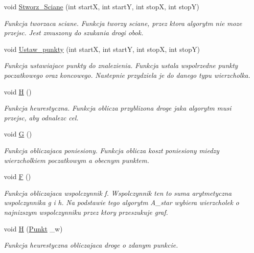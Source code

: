 \begin{DoxyCompactItemize}
\item 
void \hyperlink{classgraf_adb22c4f2d7a0f639cf121b87be24572c}{Stworz\-\_\-\-Sciane} (int start\-X, int start\-Y, int stop\-X, int stop\-Y)
\begin{DoxyCompactList}\small\item\em Funkcja tworzaca sciane. Funkcja tworzy sciane, przez ktora algorytm nie moze przejsc. Jest zmuszony do szukania drogi obok. \end{DoxyCompactList}\item 
void \hyperlink{classgraf_a932066fa342b0036a6580e797fa3a158}{Ustaw\-\_\-punkty} (int start\-X, int start\-Y, int stop\-X, int stop\-Y)
\begin{DoxyCompactList}\small\item\em Funkcja ustawiajace punkty do znalezienia. Funkcja ustala wspolrzedne punkty poczatkowego oraz koncowego. Nastepnie przydziela je do danego typu wierzcholka. \end{DoxyCompactList}\item 
void \hyperlink{classgraf_af93d38e243b89fd697acaf053752b154}{H} ()
\begin{DoxyCompactList}\small\item\em Funkcja heurestyczna. Funkcja oblicza przyblizona droge jaka algorytm musi przejsc, aby odnalezc cel. \end{DoxyCompactList}\item 
void \hyperlink{classgraf_ac8316d37401c007da5c583c80ee4de67}{G} ()
\begin{DoxyCompactList}\small\item\em Funkcja obliczajaca poniesiony. Funkcja oblicza koszt poniesiony miedzy wierzcholkiem poczatkowym a obecnym punktem. \end{DoxyCompactList}\item 
void \hyperlink{classgraf_adbcb36bc5251ca1c41a8b187edc39ded}{F} ()
\begin{DoxyCompactList}\small\item\em Funkcja obliczajaca wspolczynnik f. Wspolczynnik ten to suma arytmetyczna wspolczynnika g i h. Na podstawie tego algorytm A\-\_\-star wybiera wierzcholek o najnizszym wspolczynniku przez ktory przeszukuje graf. \end{DoxyCompactList}\item 
void \hyperlink{classgraf_ae5374a5a9711547b8afd136fad19f85b}{H} (\hyperlink{struct_punkt}{Punkt} \-\_\-w)
\begin{DoxyCompactList}\small\item\em Funkcja heurestyczna obliczajaca droge o zdanym punkcie. \end{DoxyCompactList}\item 

\end{DoxyCompactItemize}
